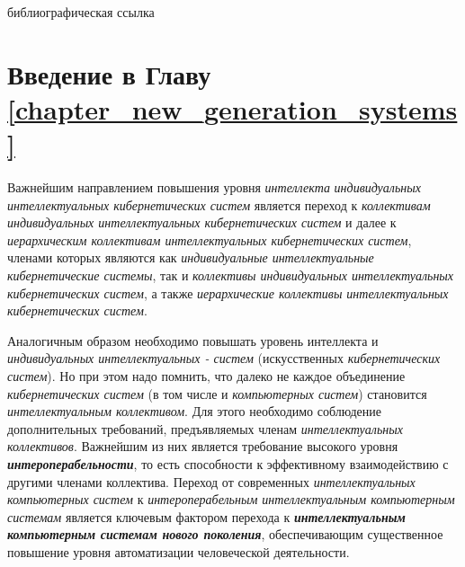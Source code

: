 \begin{SCn}
\begin{scnrelfromlist}{библиографическая ссылка}
\end{scnrelfromlist}
	
\end{SCn}

\section*{Введение в Главу \ref{chapter_new_generation_systems}}

Важнейшим направлением повышения уровня \textit{интеллекта} \textit{индивидуальных интеллектуальных кибернетических систем} является переход к \textit{коллективам индивидуальных интеллектуальных кибернетических систем} и далее к \textit{иерархическим коллективам интеллектуальных кибернетических систем}, членами которых являются как \textit{индивидуальные интеллектуальные кибернетические системы}, так и \textit{коллективы индивидуальных интеллектуальных кибернетических систем}, а также \textit{иерархические коллективы интеллектуальных кибернетических систем}. 

Аналогичным образом необходимо повышать уровень интеллекта и \textit{индивидуальных интеллектуальных - систем} (искусственных \textit{кибернетических систем}). Но при этом надо помнить, что далеко не каждое объединение \textit{ кибернетических систем} (в том числе и \textit{компьютерных систем}) становится \textit{интеллектуальным коллективом}. Для этого необходимо соблюдение дополнительных требований, предъявляемых  членам \textit{интеллектуальных коллективов}. Важнейшим из них является требование высокого уровня \textbf{\textit{интероперабельности}}, то есть способности к эффективному взаимодействию с другими членами коллектива. Переход от современных \textit{интеллектуальных компьютерных систем} к \textit{интероперабельным интеллектуальным компьютерным системам} является ключевым фактором перехода к \textbf{\textit{интеллектуальным компьютерным системам нового поколения}}, обеспечивающим существенное повышение уровня автоматизации человеческой деятельности.

